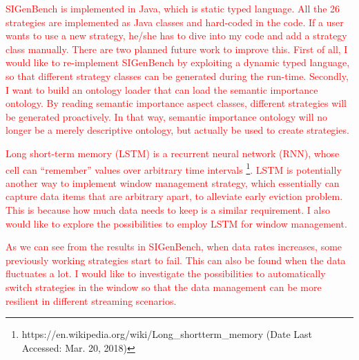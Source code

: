 \textcolor{red}{
SIGenBench is implemented in Java, which is static typed language.
All the 26 strategies are implemented as Java classes and hard-coded in the code. 
If a user wants to use a new strategy, he/she has to dive into my code and add a strategy class manually. 
There are two planned future work to improve this. 
First of all, I would like to re-implement SIGenBench by exploiting a dynamic typed language, so that different strategy classes can be generated during the run-time. 
Secondly, I want to build an ontology loader that can load the semantic importance ontology.
By reading semantic importance aspect classes, different strategies will be generated proactively. 
In that way, semantic importance ontology will no longer be a merely descriptive ontology, but actually be used to create strategies.
}

\textcolor{red}{
Long short-term memory (LSTM) \cite{DBLP:journals/neco/HochreiterS97} is a recurrent neural network (RNN), whose cell can ``remember'' values over arbitrary time intervals \footnote{https://en.wikipedia.org/wiki/Long\_short\-term\_memory (Date Last Accessed: Mar. 20, 2018)}.
LSTM is potentially another way to implement window management strategy, which essentially can capture data items that are arbitrary apart, to alleviate early eviction problem. 
This is because how much data needs to keep is a similar requirement. 
I also would like to explore the possibilities to employ LSTM for window management. 
}

\textcolor{red}{
As we can see from the results in SIGenBench, when data rates increases, some previously working strategies start to fail.
This can also be found when the data fluctuates a lot.
I would like to investigate the possibilities to automatically switch strategies in the window so that the data management can be more resilient in different streaming scenarios. 
}
%
